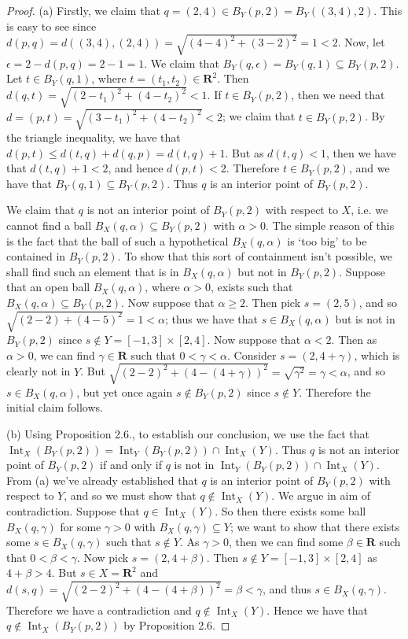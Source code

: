 \documentclass[10pt,reqno]{amsart}
\theoremstyle{definition}
\DeclareMathOperator{\Int}{Int}
\newcommand{\rr}{\mathbf R}
\begin{document}
\begin{proof}
	(a) Firstly, we claim that $q = (2,4) \in B_Y (p,2) = B_Y ((3,4), 2)$. This is easy to see since $d(p,q) = d((3,4),(2,4)) = \sqrt{(4-4)^2+(3-2)^2} = 1 < 2$. Now, let $\epsilon = 2 - d(p,q) = 2-1= 1$. We claim that $B_Y(q, \epsilon) = B_Y (q,1) \subseteq B_Y (p,2)$. Let $t \in B_Y(q, 1 )$, where $t = (t_1, t_2 ) \in \rr^2$. Then $d(q,t) = \sqrt{(2-t_1)^2 + (4-t_2)^2 } < 1$. If $t \in B_Y(p,2)$, then we need that $d = (p,t) = \sqrt{(3-t_1)^2 + (4-t_2)^2 } <2$; we claim that $t \in B_Y(p,2)$. By the triangle inequality, we have that $d(p,t) \leq d(t,q)+d(q,p) = d(t,q) + 1$. But as $d(t,q) <1$, then we have that $d(t,q) + 1 <2$, and hence $d(p,t) <2$. Therefore $t \in B_Y(p,2)$, and we have that $B_Y(q,1) \subseteq B_Y(p,2)$. Thus $q$ is an interior point of $B_Y(p,2)$.
	
	We claim that $q$ is not an interior point of $B_Y (p,2)$ with respect to $X$, i.e. we cannot find a ball $B_X(q,\alpha) \subseteq B_Y (p,2)$ with $\alpha >0$. The simple reason of this is the fact that the ball of such a hypothetical $B_X(q, \alpha)$ is `too big' to be contained in $B_Y(p,2)$. To show that this sort of containment isn't possible, we shall find such an element that is in $B_X(q,\alpha)$ but not in $B_Y(p,2)$. Suppose that an open ball $B_X(q, \alpha)$, where $\alpha > 0$, exists such that $B_X(q, \alpha) \subseteq B_Y(p,2)$. Now suppose that $\alpha \geq 2$. Then pick $s=(2,5)$, and so $\sqrt{(2-2)+ (4-5)^2} = 1 <\alpha $; thus we have that $s \in B_X(q, \alpha)$ but is not in $B_Y(p,2)$ since $s \notin Y = [-1, 3] \times [2,4]$. Now suppose that $ \alpha <2$. Then as $\alpha >0$, we can find $\gamma \in \rr$ such that $0 < \gamma <\alpha$. Consider $s = (2, 4+\gamma)$, which is clearly not in $Y$. But $\sqrt{(2-2)^2 + (4-(4+\gamma))^2} = \sqrt{\gamma^2 } = \gamma < \alpha$, and so $s \in B_X(q, \alpha)$, but yet once again $s \notin B_Y(p,2)$ since $s \notin Y$. Therefore the initial claim follows. 
	
	(b) Using Proposition 2.6., to establish our conclusion, we use the fact that $\Int_X(B_Y(p,2)) = \Int _Y (B_Y(p,2)) \cap \Int _X(Y)$. Thus $q$ is not an interior point of $B_Y(p,2)$ if and only if $q$ is not in $\Int _Y (B_Y(p,2)) \cap \Int _X(Y)$. From (a) we've already established that $q$ is an interior point of $B_Y(p,2)$ with respect to $Y$, and so we must show that $q \notin \Int _X(Y)$. We argue in aim of contradiction. Suppose that $q \in \Int _X(Y)$. So then there exists some ball $B_X(q, \gamma)$ for some $\gamma > 0$ with $B _X (q, \gamma) \subseteq Y$; we want to show that there exists some $s \in B_X(q, \gamma)$ such that $s \notin Y$. As $\gamma >0$, then we can find some $\beta \in \rr$ such that $0 < \beta < \gamma$. Now pick $s= (2, 4 + \beta )$. Then $s \notin Y = [-1, 3] \times [2,4]$ as $4+\beta > 4$. But $s \in X = \rr ^2$ and $d(s, q) = \sqrt{(2-2)^2 +(4-(4+\beta))^2} = \beta < \gamma$, and thus $s \in B_X(q, \gamma)$. Therefore we have a contradiction and $q \notin \Int _X(Y)$. Hence we have that $q \notin \Int_X(B_Y(p,2))$ by Proposition 2.6. 


\end{proof}
\end{document}
